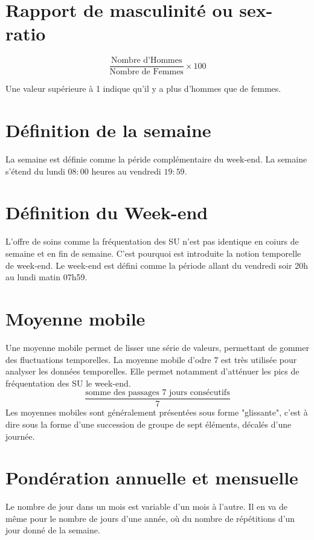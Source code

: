 \documentclass[12pt,english,french]{report}\usepackage{graphicx, color}
\begin{document}
\section*{Rapport de masculinité ou sex-ratio}
\begin{displaymath}
    \frac{\text{Nombre d'Hommes}}{\text{Nombre de Femmes}} \times 100
\end{displaymath}

Une valeur supérieure à 1 indique qu'il y a plus d'hommes que de femmes.

\section*{Définition de la semaine}
La semaine est définie comme la péride complémentaire du week-end. La semaine s'étend du lundi $08:00$ heures au vendredi $19:59$.

\section*{Définition du Week-end}
L'offre de soins comme la fréquentation des SU n'est pas identique en coiurs de semaine et en fin de semaine. C'est pourquoi est introduite la notion temporelle de week-end.
Le week-end est défini comme la période allant du vendredi soir 20h au lundi matin 07h59.

\section*{Moyenne mobile}
Une moyenne mobile permet de lisser une série de valeurs, permettant de gommer des fluctuations temporelles. La moyenne mobile d'odre $7$ est très utilisée pour analyser les données temporelles. Elle permet notamment d'atténuer les pics de fréquentation des SU le week-end.
\begin{displaymath}
    \frac{\text{somme des passages 7 jours consécutifs}}{7}
\end{displaymath}
Les moyennes mobiles sont généralement présentées sous forme "glissante", c'est à dire sous la forme d'une succession de groupe de sept éléments, décalés d'une journée.

\section*{Pondération annuelle et mensuelle}
Le nombre de jour dans un mois est variable d'un mois à l'autre. Il en va de même pour le nombre de jours d'une année, où du nombre de répétitions d'un jour donné de la semaine.
\end{document}
